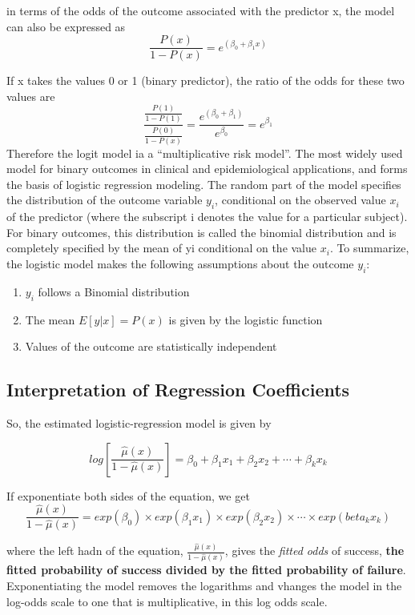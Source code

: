 \documentclass[
]{article}
\providecommand{\tightlist}{%
  \setlength{\itemsep}{0pt}\setlength{\parskip}{0pt}}
\begin{document}
in terms of the odds of the outcome associated with the predictor x, the
model can also be expressed as
\[\frac{P(x)}{1-P(x)} = e^{(\beta_0 + \beta_1 x)}\]

If x takes the values 0 or 1 (binary predictor), the ratio of the odds
for these two values are
\[\frac{\frac{P(1)}{1-P(1)}}{\frac{P(0)}{1-P(x)}} = \frac{e^{(\beta_0 + \beta_1)}}{e^{\beta_0}} = e^{\beta_1}\]
Therefore the logit model ia a ``multiplicative risk model''. The most
widely used model for binary outcomes in clinical and epidemiological
applications, and forms the basis of logistic regression modeling. The
random part of the model specifies the distribution of the outcome
variable \(y_i\), conditional on the observed value \(x_i\) of the
predictor (where the subscript i denotes the value for a particular
subject). For binary outcomes, this distribution is called the binomial
distribution and is completely specified by the mean of yi conditional
on the value \(x_i\). To summarize, the logistic model makes the
following assumptions about the outcome \(y_i\):

\begin{enumerate}
\def\labelenumi{\arabic{enumi}.}
\tightlist
\item
  \(y_i\) follows a Binomial distribution
\item
  The mean \(E[y|x] = P(x)\) is given by the logistic function
\item
  Values of the outcome are statistically independent
\end{enumerate}

\hypertarget{interpretation-of-regression-coefficients}{%
\subsection{Interpretation of Regression
Coefficients}\label{interpretation-of-regression-coefficients}}

So, the estimated logistic-regression model is given by

\[log[\frac{\hat\mu(x)}{1-\hat\mu(x)}] = \beta_0 + \beta_1 x_1 + \beta_2 x_2 + \cdots + \beta_k x_k\]

If exponentiate both sides of the equation, we get
\[\frac{\hat\mu(x)}{1-\hat\mu(x)} = exp(\beta_0) \times exp(\beta_1 x_1) \times exp(\beta_2 x_2) \times \cdots \times exp(beta_k x_k)\]

where the left hadn of the equation,
\(\frac{\hat\mu(x)}{1-\hat\mu(x)}\), gives the \emph{fitted odds} of
success, \textbf{the fitted probability of success divided by the fitted
probability of failure}. Exponentiating the model removes the logarithms
and vhanges the model in the log-odds scale to one that is
multiplicative, in this log odds scale.
\end{document}
